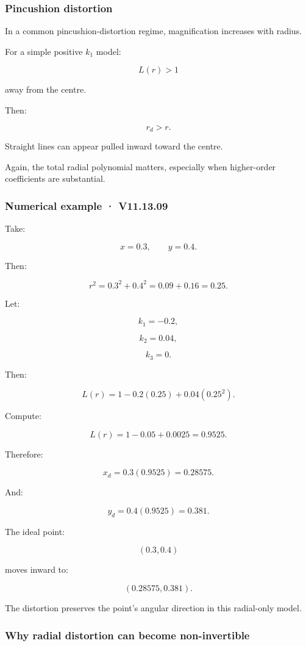 \subsubsection{Pincushion distortion}\label{pincushion-distortion}

In a common pincushion-distortion regime, magnification increases with radius.

For a simple positive \(k_1\) model:

\[
 L(r)>1
\]

away from the centre.

Then:

\[
 r_d>r.
\]

Straight lines can appear pulled inward toward the centre.

Again, the total radial polynomial matters, especially when higher-order coefficients are substantial.

\subsubsection{Numerical example · V11.13.09}\label{numerical-example-v11.13.09}

Take:

\[
 x=0.3,\qquad y=0.4.
\]

Then:

\[
 r^2=0.3^2+0.4^2 =0.09+0.16 =\boxed{0.25}.
\]

Let:

\[
 k_1=-0.2,
\]

\[
 k_2=0.04,
\]

\[
 k_3=0.
\]

Then:

\[
 L(r)=1-0.2(0.25)+0.04(0.25^2).
\]

Compute:

\[
 L(r)=1-0.05+0.0025 =\boxed{0.9525}.
\]

Therefore:

\[
 x_d=0.3(0.9525) =\boxed{0.28575}.
\]

And:

\[
 y_d=0.4(0.9525) =\boxed{0.381}.
\]

The ideal point:

\[
 (0.3,0.4)
\]

moves inward to:

\[
 \boxed{(0.28575,0.381)}.
\]

The distortion preserves the point's angular direction in this radial-only model.

\subsubsection{Why radial distortion can become non-invertible}\label{why-radial-distortion-can-become-non-invertible}

